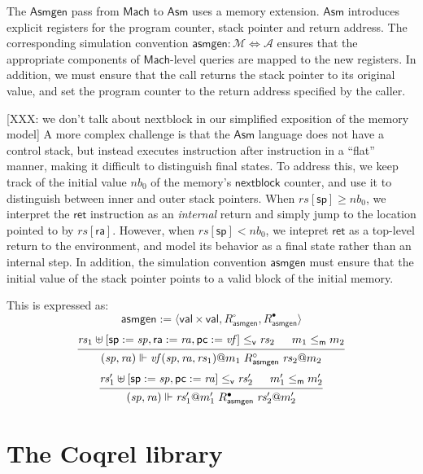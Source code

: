 \documentclass[draft,11pt]{report}
\newcommand{\kw}[1]{\ensuremath{ \mathsf{#1} }}
\newcommand{\que}{\circ}         %
\newcommand{\ans}{\bullet}       %
\newcommand{\vref}{\le_\kw{v}}   %
\newcommand{\mext}{\le_\kw{m}}   %
\begin{document}
The \kw{Asmgen} pass from \kw{Mach} to \kw{Asm}
uses a memory extension.
\kw{Asm} introduces explicit registers for the
program counter, stack pointer and return address.
The corresponding simulation convention
$\kw{asmgen} : \mathcal{M} \Leftrightarrow \mathcal{A}$
ensures that the appropriate components of
\kw{Mach}-level queries are mapped to the new registers.
In addition,
we must ensure that the call returns the stack pointer
to its original value,
and set the program counter to the return address
specified by the caller.

[XXX: we don't talk about nextblock in our simplified
exposition of the memory model]
A more complex challenge is that the $\kw{Asm}$ language
does not have a control stack,
but instead executes instruction after instruction
in a ``flat'' manner,
making it difficult to distinguish final states.
To address this,
we keep track of the initial value $\mathit{nb}_0$ of
the memory's $\kw{nextblock}$ counter,
and use it to distinguish between inner and outer
stack pointers.
When $\mathit{rs}[\kw{sp}] \ge \mathit{nb}_0$,
we interpret the \kw{ret} instruction as an \emph{internal} return
and simply jump to the location pointed to by $\mathit{rs}[\kw{ra}]$.
However, when $\mathit{rs}[\kw{sp}] < \mathit{nb}_0$,
we intepret \kw{ret} as a top-level return to the environment,
and model its behavior as a final state
rather than an internal step.
In addition,
the simulation convention $\kw{asmgen}$
must ensure that the initial value of the stack pointer
points to a valid block of the initial memory.

This is expressed as:
\[
  \kw{asmgen} := \langle \kw{val} \times \kw{val},
    R_\kw{asmgen}^\que, R_\kw{asmgen}^\ans \rangle
\]
\[
  \begin{prooftree}
  \hypo{\mathit{rs}_1 \uplus
    [\kw{sp} := \mathit{sp}, \kw{ra} := \mathit{ra}, \kw{pc} := \mathit{vf}]
    \vref \mathit{rs}_2}
  \hypo{m_1 \mext m_2}
  \infer2{
    (\mathit{sp}, \mathit{ra}) \Vdash
     \mathit{vf}(\mathit{sp}, \mathit{ra}, \mathit{rs}_1)@m_1
     \mathrel{R_\kw{asmgen}^\que}
     \mathit{rs}_2@m_2}
  \end{prooftree}
\]
\[
  \begin{prooftree}
  \hypo{
    \mathit{rs}_1' \uplus [\kw{sp} := \mathit{sp}, \kw{pc} := \mathit{ra}]
    \vref \mathit{rs}_2'}
  \hypo{m_1' \mext m_2'}
  \infer2{
    (\mathit{sp}, \mathit{ra}) \Vdash \mathit{rs}_1'@m_1'
    \mathrel{R_\kw{asmgen}^\ans}
    \mathit{rs}_2'@m_2'}
  \end{prooftree}
\]




\chapter{The Coqrel library} %




\end{document}
